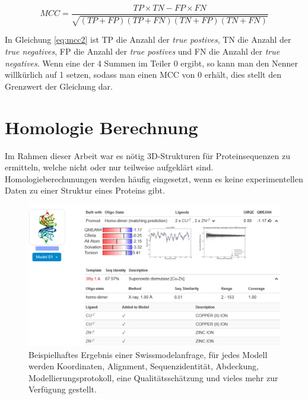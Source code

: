 \begin{equation}
    MCC = \frac{TP \times TN - FP \times FN}{\sqrt{(TP + FP)(TP + FN)(TN + FP)(TN + FN)}}
    \label{eq:mcc2}
\end{equation}

In Gleichung \ref{eq:mcc2} ist TP die Anzahl der \emph{true postives}, TN die Anzahl der \emph{true negatives}, FP die Anzahl der \emph{true postives} und FN die Anzahl der \emph{true negatives}. Wenn eine der 4 Summen im Teiler 0 ergibt, so kann man den Nenner willkürlich auf 1 setzen, sodass man einen MCC von 0 erhält, dies stellt den Grenzwert der Gleichung dar.


\section{Homologie Berechnung}
\label{sec:siwssmodel}
Im Rahmen dieser Arbeit war es nötig 3D-Strukturen für Proteinsequenzen zu ermitteln, welche nicht oder nur teilweise aufgeklärt sind. Homologieberechunungen werden häufig eingesetzt, wenn es keine experimentellen Daten zu einer Struktur eines Proteins gibt.
\begin{figure}[H]
    \includegraphics[width=.95\textwidth]{images/Swissmodel.png}
    \caption{Beispielhaftes Ergebnis einer Swissmodelanfrage, für jedes Modell werden Koordinaten, Alignment, Sequenzidentität, Abdeckung, Modellierungsprotokoll, eine Qualitätsschätzung und vieles mehr zur Verfügung gestellt.}
    \label{fig:swissmodel}
\end{figure}

